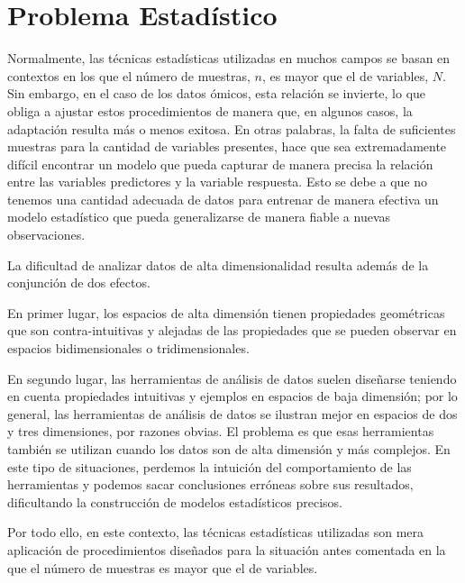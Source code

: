 

\section{Problema Estadístico}

Normalmente, las técnicas estadísticas utilizadas en muchos campos se basan en contextos en los que 
el número de muestras, $n$, es mayor que el de variables, $N$. Sin embargo, en el caso de los datos ómicos, esta relación se invierte,
lo que obliga a ajustar estos procedimientos de manera que, en algunos casos, la adaptación resulta más o menos exitosa. En otras palabras,
la falta de suficientes muestras para la cantidad de variables presentes, hace que sea extremadamente difícil encontrar un modelo que pueda capturar
de manera precisa la relación entre las variables predictores y la variable respuesta. Esto se debe a que no tenemos una cantidad adecuada 
de datos para entrenar de manera efectiva un modelo estadístico que pueda generalizarse de manera fiable a nuevas observaciones.

La dificultad de analizar datos de alta dimensionalidad resulta además de la conjunción de dos efectos.

En primer lugar, los espacios de alta dimensión tienen propiedades geométricas que son contra-intuitivas y alejadas de las propiedades
que se pueden observar en espacios bidimensionales o tridimensionales. 

En segundo lugar, las herramientas de análisis de datos suelen diseñarse teniendo en cuenta propiedades intuitivas
y ejemplos en espacios de baja dimensión; por lo general, las herramientas de análisis de datos se ilustran mejor en espacios de dos y 
tres dimensiones, por razones obvias. El problema es que esas herramientas también se utilizan cuando los datos son de alta dimensión y
más complejos. En este tipo de situaciones, perdemos la intuición del comportamiento de las herramientas y podemos sacar conclusiones erróneas
sobre sus resultados, dificultando la construcción de modelos estadísticos precisos. \newline

Por todo ello, en este contexto, las técnicas estadísticas utilizadas son mera aplicación de procedimientos diseñados para la situación antes comentada en la 
que el número de muestras es mayor que el de variables. \newline

